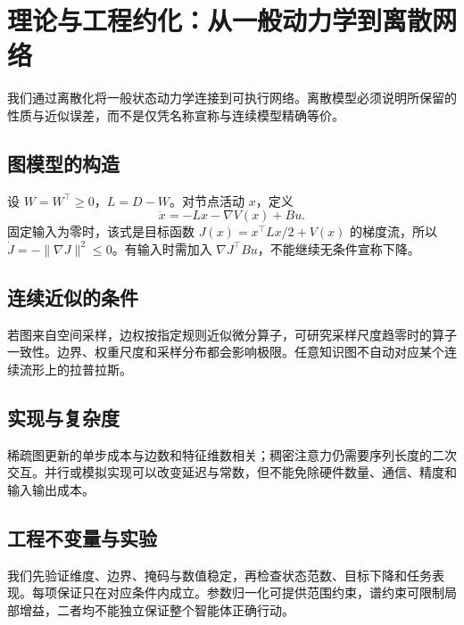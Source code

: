 \chapter{理论与工程约化：从一般动力学到离散网络}
\label{sec:section_5204}
\label{sec:tpug_operator_design_formulas}

我们通过离散化将一般状态动力学连接到可执行网络。离散模型必须说明所保留的性质与近似误差，而不是仅凭名称宣称与连续模型精确等价。
\section{图模型的构造}
设 $W=W^\top\ge0$，$L=D-W$。对节点活动 $x$，定义
\begin{equation}\dot x=-Lx-\nabla V(x)+Bu.\end{equation}
固定输入为零时，该式是目标函数 $J(x)=x^\top Lx/2+V(x)$ 的梯度流，所以 $\dot J=-\|\nabla J\|^2\le0$。有输入时需加入 $\nabla J^\top Bu$，不能继续无条件宣称下降。
\section{连续近似的条件}
若图来自空间采样，边权按指定规则近似微分算子，可研究采样尺度趋零时的算子一致性。边界、权重尺度和采样分布都会影响极限。任意知识图不自动对应某个连续流形上的拉普拉斯。
\section{实现与复杂度}
稀疏图更新的单步成本与边数和特征维数相关；稠密注意力仍需要序列长度的二次交互。并行或模拟实现可以改变延迟与常数，但不能免除硬件数量、通信、精度和输入输出成本。
\section{工程不变量与实验}
我们先验证维度、边界、掩码与数值稳定，再检查状态范数、目标下降和任务表现。每项保证只在对应条件内成立。参数归一化可提供范围约束，谱约束可限制局部增益，二者均不能独立保证整个智能体正确行动。
